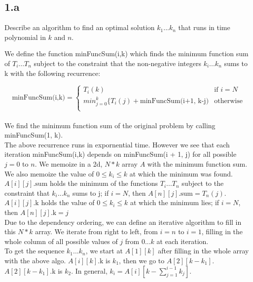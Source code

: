 \documentclass[11pt]{article}
\begin{document}




\subsection *{1.a} Describe an algorithm to find an optimal solution $k_1...k_n$ that runs in time polynomial in $k$ and $n$. 
\begin{solution}
We define the function minFuncSum(i,k) which finds the minimum function sum of $T_i... T_n$ subject to the constraint that the non-negative integers $k_i...k_n$ sums to k with the following recurrence: 

\[
	\text{minFuncSum(i,k)} = \begin{cases}
		T_i(k) & \text{if $i = N$} \\
		min_{j=0}^{k} \{T_i(j) + \text{minFuncSum(i+1, k-j)} & \text{otherwise} \\
	\end{cases}
\]
\\ 
We find the minimum function sum of the original problem by calling minFuncSum(1, k). \\

The above recurrence runs in expornential time. However we see that each iteration minFuncSum(i,k) depends on minFuncSum(i + 1, j) for all possible $j = 0 $ to $n$. We memoize in a 2d, $N*k$ array $A$ with the minimum function sum. We also memoize the value of $0 \leq k_i \leq k$ at which the minimum was found. \\ 

$A[i][j].\text{sum}$ holds the minimum of the functions $T_i...T_n$ subject to the constraint that $k_i...k_n$ sums to j; if $i = N$, then $A[n][j].\text{sum} = T_n(j)$. $A[i][j].\text{k}$ holds the value of $0 \leq k_i \leq k$ at which the minimum lies; if $i = N$, then $A[n][j].\text{k}=j$ \\

Due to the dependency ordering, we can define an iterative algorithm to fill in this $N*k$ array. We iterate from right to left, from $i=n$ to $i=1$, filling in the whole column of all possible values of $j$ from $0...k$ at each iteration. \\ 

To get the sequence $k_1...k_n$, we start at $A[1][k]$ after filling in the whole array with the above algo. $A[i][k].\text{k}$ is $k_1$, then we go to $A[2][k-k_1]$. $A[2][k-k_1].\text{k}$ is $k_2$. In general, $k_i= A[i][k-\sum_{j=1}^{i-1} k_j]$. \\ 


\end{solution}
\end{document}

